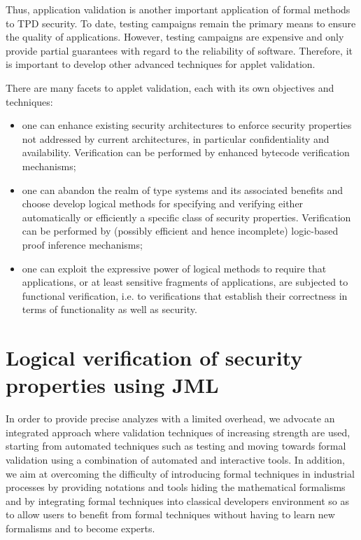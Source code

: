 Thus, application validation is another important application of
formal methods to TPD security. To date, testing campaigns remain the
primary means to ensure the quality of applications. However, testing
campaigns are expensive and only provide partial guarantees with
regard to the reliability of software. Therefore, it is important to
develop other advanced techniques for applet validation.

There are many facets to applet validation, each with its own
objectives and techniques:
\begin{itemize}
\item one can enhance existing security architectures to enforce
security properties not addressed by current architectures, in
particular confidentiality and availability.  Verification can be
performed by enhanced bytecode verification mechanisms;


\item one can abandon the realm of type systems and its associated
benefits and choose develop logical methods for specifying and
verifying either automatically or efficiently a specific class of
security properties. Verification can be performed by (possibly
efficient and hence incomplete) logic-based proof inference
mechanisms;




\item one can exploit the expressive power of logical methods to
require that applications, or at least sensitive fragments of
applications, are subjected to functional verification, i.e. to
verifications that establish their correctness in terms of
functionality as well as security.
\end{itemize}


\section{Logical verification of security properties using JML}
In order to provide precise analyzes with a limited overhead, we
advocate an integrated approach where validation techniques of
increasing strength are used, starting from automated techniques such
as testing and moving towards formal validation using a combination of
automated and interactive tools. In addition, we aim at overcoming the
difficulty of introducing formal techniques in industrial processes by
providing notations and tools hiding the mathematical formalisms and
by integrating formal techniques into classical developers environment
so as to allow users to benefit from formal techniques without having
to learn new formalisms and to become experts.

